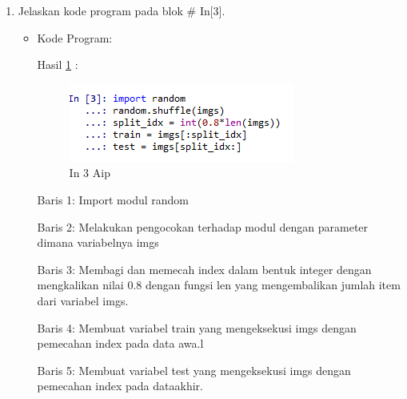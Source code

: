 \begin{enumerate}
\item Jelaskan kode program pada blok \# In[3].
\begin{itemize}
\item Kode Program:

\par Hasil \ref{in3aip} :
\begin{figure}[!hbtp]
\centering
\includegraphics[scale=0.7]{figures/AIP/prak3.PNG}
\caption{In 3 Aip}
\label{in3aip}
\end{figure}
\par Baris 1: Import modul random
\par Baris 2: Melakukan pengocokan terhadap modul dengan parameter dimana variabelnya imgs
\par Baris 3: Membagi dan memecah index dalam bentuk integer dengan mengkalikan nilai 0.8 dengan fungsi len yang mengembalikan jumlah item dari variabel imgs.
\par Baris 4: Membuat variabel train yang mengeksekusi imgs dengan pemecahan index pada data awa.l
\par Baris 5: Membuat variabel test yang mengeksekusi imgs dengan pemecahan index pada dataakhir.

\end{itemize}
\par


\end{enumerate}
